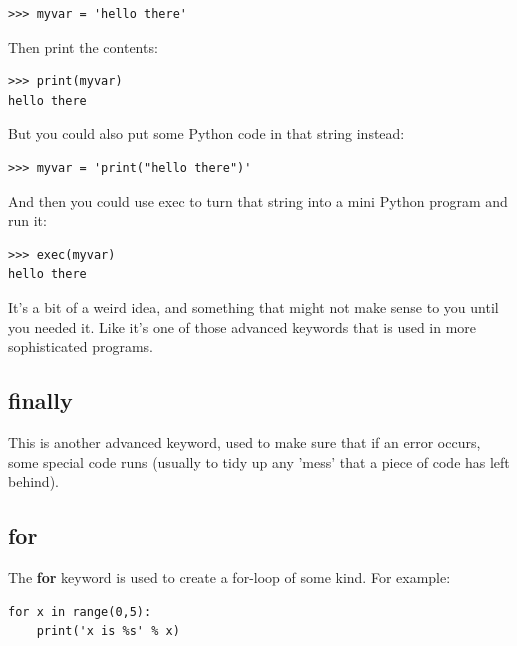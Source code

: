 \begin{listing}
\begin{verbatim}
>>> myvar = 'hello there'
\end{verbatim}
\end{listing}

\noindent
Then print the contents:

\begin{listing}
\begin{verbatim}
>>> print(myvar)
hello there
\end{verbatim}
\end{listing}

\noindent
But you could also put some Python code in that string instead:

\begin{listing}
\begin{verbatim}
>>> myvar = 'print("hello there")'
\end{verbatim}
\end{listing}

\noindent
And then you could use exec to turn that string into a mini Python program and run it:

\begin{listing}
\begin{verbatim}
>>> exec(myvar)
hello there
\end{verbatim}
\end{listing}

It's a bit of a weird idea, and something that might not make sense to you until you needed it.  Like  it's one of those advanced keywords that is used in more sophisticated programs.

\subsection*{finally}

This is another advanced keyword, used to make sure that if an error occurs, some special code runs (usually to tidy up any 'mess' that a piece of code has left behind).

\subsection*{for}

The \textbf{for} keyword is used to create a for-loop of some kind. For example:

\begin{listing}
\begin{verbatim}
for x in range(0,5):
    print('x is %s' % x)
\end{verbatim}
\end{listing}

